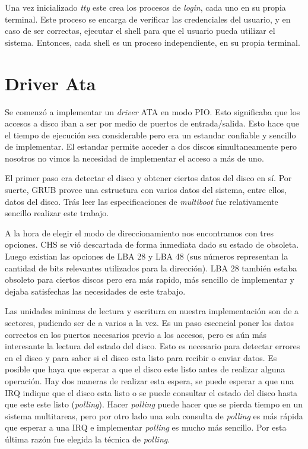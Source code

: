 \documentclass[a4paper,10pt]{article}
\begin{document}
Una vez inicializado \textit{tty} este crea los procesos de \textit{login}, cada uno en su propia terminal.
Este proceso se encarga de verificar las credenciales del usuario, y en caso de ser correctas, ejecutar el shell para que el usuario pueda utilizar el sistema.
Entonces, cada shell es un proceso independiente, en su propia terminal.


\newpage
\section{Driver Ata}
    Se comenzó a implementar un \textit{driver} ATA en modo PIO. Esto significaba que los accesos a disco iban a ser
    por medio de puertos de entrada/salida. Esto hace que el tiempo de ejecución sea considerable pero era un estandar
    confiable y sencillo de implementar.
    El estandar permite acceder a dos discos simultaneamente pero nosotros no vimos la necesidad de implementar el 
    acceso a más de uno.
    
    El primer paso era detectar el disco y obtener ciertos datos del disco en sí. Por suerte, GRUB provee una estructura
    con varios datos del sistema, entre ellos, datos del disco. Trás leer las especificaciones de \textit{multiboot}
    fue relativamente sencillo realizar este trabajo.

    A la hora de elegir el modo de direccionamiento nos encontramos con tres opciones. CHS se vió descartada de forma
    inmediata dado su estado de obsoleta. Luego existian las opciones de LBA 28 y LBA 48 (sus números representan
    la cantidad de bits relevantes utilizados para la dirección). LBA 28 también estaba obsoleto para ciertos discos
    pero era más rapido, más sencillo de implementar y dejaba satisfechas las necesidades de este trabajo.

    Las unidades minimas de lectura y escritura en nuestra implementación son de a sectores, pudiendo ser de a
    varios a la vez. Es un paso escencial poner los datos correctos en los puertos necesarios previo a los accesos, pero
    es aún más interesante la lectura del estado del disco. Esto es necesario para detectar errores en el disco
    y para saber si el disco esta listo para recibir o enviar datos. Es posible que haya que esperar a que el disco
    este listo antes de realizar alguna operación. Hay dos maneras de realizar esta espera, se puede esperar a que una IRQ
    indique que el disco esta listo o se puede consultar el estado del disco hasta que este este listo (\textit{polling}).
    Hacer \textit{polling} puede hacer que se pierda tiempo en un sistema multitareas, pero por otro lado una sola
    consulta de \textit{polling} es más rápida que esperar a una IRQ e implementar \textit{polling} es mucho más sencillo.
    Por esta última razón fue elegida la técnica de \textit{polling}.
\newpage
\end{document}
